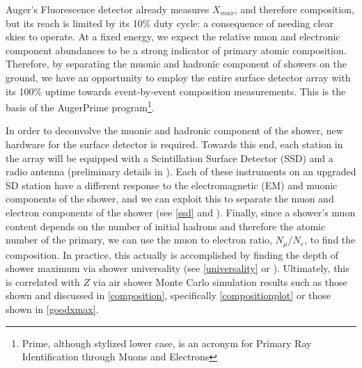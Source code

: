 Auger's Fluorescence detector already measures $X_{max}$, and therefore composition, but its reach is limited by its 10\% duty cycle: a consequence of needing clear skies to operate. At a fixed energy, we expect the relative muon and electronic component abundances to be a strong indicator of primary atomic composition. Therefore, by separating the muonic and hadronic component of showers on the ground, we have an opportunity to employ the entire surface detector array with its 100\% uptime towards event-by-event composition measurements.  This is the basis of the AugerPrime program\footnote{Prime, although stylized lower case, is an acronym for Primary Ray Identification through Muons and Electrons}. 

In order to deconvolve the muonic and hadronic component of the shower, new hardware for the surface detector is required. Towards this end, each station in the array will be equipped with a Scintillation Surface Detector (SSD) and a radio antenna (preliminary details in \cite{dutchaera}). Each of these instruments on an upgraded SD station have a different response to the electromagnetic (EM) and muonic components of the shower, and we can exploit this to separate the muon and electron components of the shower (see \autoref{ssd} and \cite{primeuniv, univpart}). Finally, since a shower's muon content depends on the number of initial hadrons and therefore the atomic number of the primary, we can use the muon to electron ratio, $N_\mu /N_e$, to find the composition. In practice, this actually is accomplished by finding the depth of shower maximum via shower universality (see \autoref{universality} or \cite{univpart}). Ultimately, this is correlated with $Z$ via air shower Monte Carlo simulation results such as those shown and discussed in \autoref{composition}, specifically \autoref{compositionplot} or those shown in \autoref{goodxmax}.

